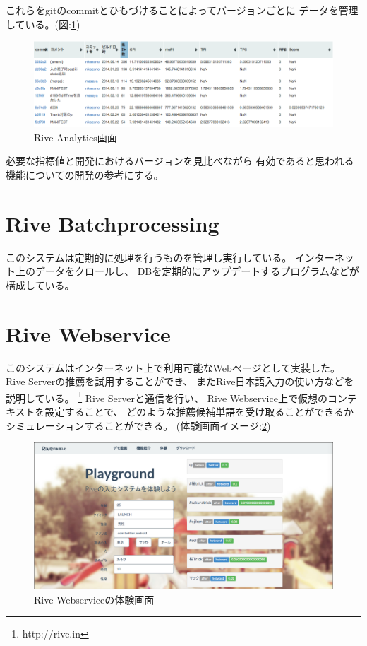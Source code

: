これらをgitのcommitとひもづけることによってバージョンごとに
データを管理している。(図:\ref{fig:riveanalytics})
\begin{figure}[htbp]
  \begin{center}
    \includegraphics[width=170mm,bb=0 0 952 274]{images/riveanalytics.png}
    \caption{Rive Analytics画面}
    \label{fig:riveanalytics}
  \end{center}
\end{figure}
必要な指標値と開発におけるバージョンを見比べながら
有効であると思われる機能についての開発の参考にする。

\section{Rive Batchprocessing}
このシステムは定期的に処理を行うものを管理し実行している。
インターネット上のデータをクロールし、
DBを定期的にアップデートするプログラムなどが構成している。

\section{Rive Webservice}
このシステムはインターネット上で利用可能なWebページとして実装した。
Rive Serverの推薦を試用することができ、
またRive日本語入力の使い方などを説明している。
\footnote{http://rive.in}
Rive Serverと通信を行い、
Rive Webservice上で仮想のコンテキストを設定することで、
どのような推薦候補単語を受け取ることができるか
シミュレーションすることができる。
(体験画面イメージ:\ref{fig:rivewebservice})
\begin{figure}[htbp]
  \begin{center}
    \includegraphics[width=160mm,bb=0 0 1349 662]{images/rivewebservice.png}
    \caption{Rive Webserviceの体験画面}
    \label{fig:rivewebservice}
  \end{center}
\end{figure}

